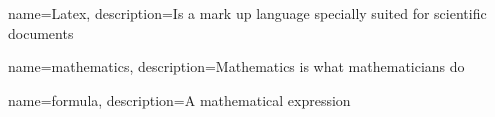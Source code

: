 
{
	name=Latex,
	description={Is a mark up language specially suited for 
		scientific documents}
}

{
	name=mathematics,
	description={Mathematics is what mathematicians do}
}

{
	name=formula,
	description={A mathematical expression}
}


		


